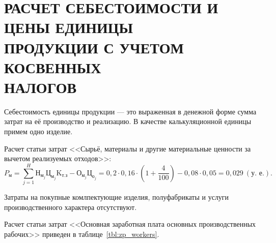 \section[%
Расчет себестоимости и цены единицы продукции с учетом \\
косвенных налогов
]{%
РАСЧЕТ СЕБЕСТОИМОСТИ И ЦЕНЫ ЕДИНИЦЫ \\
ПРОДУКЦИИ С УЧЕТОМ КОСВЕННЫХ \\
НАЛОГОВ
}
\label{sec:cost}

Себестоимость единицы продукции --- это выраженная в денежной форме
сумма затрат на её производство и реализацию.
В качестве калькуляционной единицы примем одно изделие.

Расчет статьи затрат 
<<Сырьё, материалы и другие материальные ценности
за вычетом реализуемых отходов>>:
\begin{equation*}
P_{\text{м}} = 
\sum^{H}_{j=1} \text{Н}_{\text{м}_j} \text{Ц}_{\text{м}_j} \text{K}_{\text{т.з}} 
- \text{О}_{\text{м}_j} \text{Ц}_{\text{о}_j} = 
0{,}2 \cdot 0{,}16 \cdot (1 + \dfrac{4}{100}) - 0{,}08 \cdot 0{,}05 =
0{,}029 \: (\text{у.~е.}).
\end{equation*}

Затраты на покупные комлпектующие изделия, 
полуфабрикаты и услуги производственного характера отсутствуют.

Расчет статьи затрат
<<Основная заработная плата основных производственных рабочих>>
приведен в таблице~\ref{tbl:zp_workers}.

